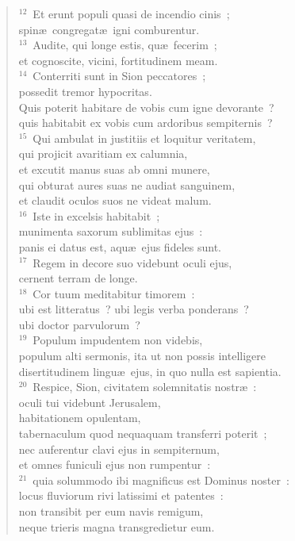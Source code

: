 \begin{verse}
${}^{12}$~Et erunt populi quasi de incendio cinis~;\\ spin\ae\ congregat\ae\ igni comburentur.\\
${}^{13}$~Audite, qui longe estis, qu\ae\ fecerim~;\\ et cognoscite, vicini, fortitudinem meam.\\
${}^{14}$~Conterriti sunt in Sion peccatores~;\\ possedit tremor hypocritas.\\ Quis poterit habitare de vobis cum igne devorante~?\\ quis habitabit ex vobis cum ardoribus sempiternis~?\\
${}^{15}$~Qui ambulat in justitiis et loquitur veritatem,\\ qui projicit avaritiam ex calumnia,\\ et excutit manus suas ab omni munere,\\ qui obturat aures suas ne audiat sanguinem,\\ et claudit oculos suos ne videat malum.\\
${}^{16}$~Iste in excelsis habitabit~;\\ munimenta saxorum sublimitas ejus~:\\ panis ei datus est, aqu\ae\ ejus fideles sunt.\\
${}^{17}$~Regem in decore suo videbunt oculi ejus,\\ cernent terram de longe.\\
${}^{18}$~Cor tuum meditabitur timorem~:\\ ubi est litteratus~? ubi legis verba ponderans~?\\ ubi doctor parvulorum~?\\
${}^{19}$~Populum impudentem non videbis,\\ populum alti sermonis, ita ut non possis intelligere\\ disertitudinem lingu\ae\ ejus, in quo nulla est sapientia.\\
${}^{20}$~Respice, Sion, civitatem solemnitatis nostr\ae~:\\ oculi tui videbunt Jerusalem,\\ habitationem opulentam,\\ tabernaculum quod nequaquam transferri poterit~;\\ nec auferentur clavi ejus in sempiternum,\\ et omnes funiculi ejus non rumpentur~:\\
${}^{21}$~quia solummodo ibi magnificus est Dominus noster~:\\ locus fluviorum rivi latissimi et patentes~:\\ non transibit per eum navis remigum,\\ neque trieris magna transgredietur eum.\\

\end{verse}
